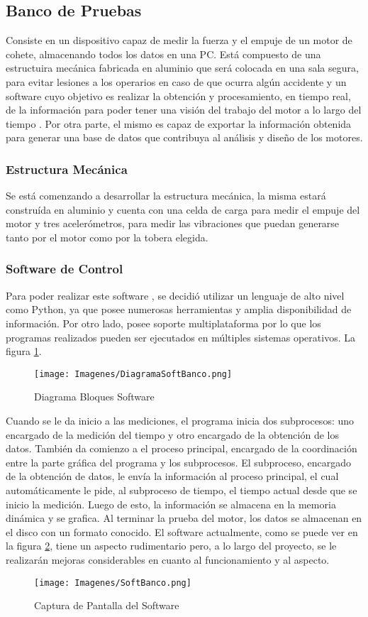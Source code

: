 \documentclass[a4paper]{article} %
\begin{document}
\subsection{Banco de Pruebas}
Consiste en un dispositivo capaz de medir la fuerza y el empuje de un motor de cohete, almacenando todos los datos en una PC. Está compuesto de una estructuira mecánica fabricada en aluminio que será colocada en una sala segura, para evitar lesiones a los operarios en caso de que ocurra algún accidente y un software cuyo objetivo es realizar la obtención y procesamiento, en tiempo real, de la información para poder tener una visión del trabajo del motor a lo largo del tiempo . Por otra parte, el mismo es capaz de exportar la información obtenida para generar una base de datos que contribuya al análisis y diseño de los motores.

\subsubsection{Estructura Mecánica}
Se está comenzando a desarrollar la estructura mecánica, la misma estará construída en aluminio y cuenta con una celda de carga para medir el empuje del motor y tres acelerómetros, para medir las vibraciones que puedan generarse tanto por el motor como por la tobera elegida.

\subsubsection{Software de Control}
Para poder realizar este software , se decidió utilizar un lenguaje de alto nivel como Python, ya que posee numerosas herramientas y amplia disponibilidad de información. Por otro lado, posee soporte multiplataforma por lo que los programas realizados pueden ser ejecutados en múltiples sistemas operativos. La figura \ref{fig:BloquesSoftBanco}.
\begin{figure}[!h]
  \centering
    \texttt{[image: Imagenes/DiagramaSoftBanco.png]}
  \caption{Diagrama Bloques Software}
  \label{fig:BloquesSoftBanco}
\end{figure}
Cuando se le da inicio a las mediciones, el programa inicia dos subprocesos: uno encargado de la medición del tiempo y otro encargado de la obtención de los datos. También da comienzo a el proceso principal, encargado de la coordinación entre la parte gráfica del programa y los subprocesos. El subproceso, encargado de la obtención de datos, le envía la información al proceso principal, el cual automáticamente le pide, al subproceso de tiempo, el tiempo actual desde que se inicio la medición. Luego de esto, la información se almacena en la memoria dinámica y se grafica. Al terminar la prueba del motor, los datos se almacenan en el disco con un formato conocido.
El software actualmente, como se puede ver en la figura \ref{fig:SoftBanco}, tiene un aspecto rudimentario pero, a lo largo del proyecto, se le realizarán mejoras considerables en cuanto al funcionamiento y al aspecto.
\begin{figure}[!h]
  \centering
    \texttt{[image: Imagenes/SoftBanco.png]}
  \caption{Captura de Pantalla del Software}
  \label{fig:SoftBanco}
\end{figure}
\end{document}
